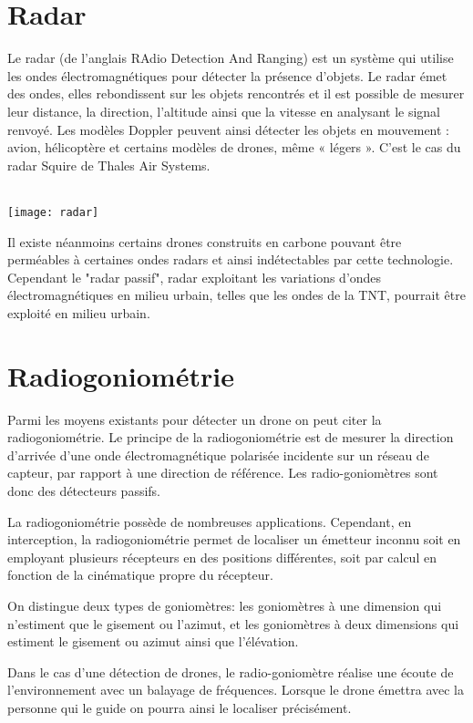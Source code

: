\section{Radar}
Le radar (de l'anglais RAdio Detection And Ranging) est un système qui utilise les ondes électromagnétiques pour détecter la présence d'objets. Le radar émet des ondes, elles rebondissent sur les objets rencontrés et il est possible de mesurer leur distance, la direction, l'altitude ainsi que la vitesse en analysant le signal renvoyé. Les modèles Doppler peuvent ainsi détecter les objets en mouvement : avion, hélicoptère et certains modèles de drones, même « légers ». C'est le cas du radar Squire de Thales Air Systems. 

~\\

\texttt{[image: radar]}

Il existe néanmoins certains drones construits en carbone pouvant être perméables à certaines ondes radars et ainsi indétectables par cette technologie. Cependant le "radar passif", radar exploitant les variations d'ondes électromagnétiques en milieu urbain, telles que les ondes de la TNT, pourrait être exploité en milieu urbain.



\section{Radiogoniométrie}

Parmi les moyens existants pour détecter un drone on peut citer la radiogoniométrie. Le principe de la radiogoniométrie est de mesurer la direction d'arrivée d'une onde électromagnétique polarisée incidente sur un réseau de capteur, par rapport à une direction de référence. Les radio-goniomètres sont donc des détecteurs passifs. 

La radiogoniométrie possède de nombreuses applications. Cependant, en interception, la radiogoniométrie permet de localiser un émetteur inconnu soit en employant plusieurs récepteurs en des positions différentes, soit par calcul en fonction de la cinématique propre du récepteur. 

On distingue deux types de goniomètres: les goniomètres à une dimension qui n'estiment que le gisement ou l'azimut, et les goniomètres à deux dimensions qui estiment le gisement ou azimut ainsi que l'élévation. 


Dans le cas d'une détection de drones, le radio-goniomètre réalise une écoute de l'environnement avec un balayage de fréquences. Lorsque le drone émettra avec la personne qui le guide on pourra ainsi le localiser précisément.

